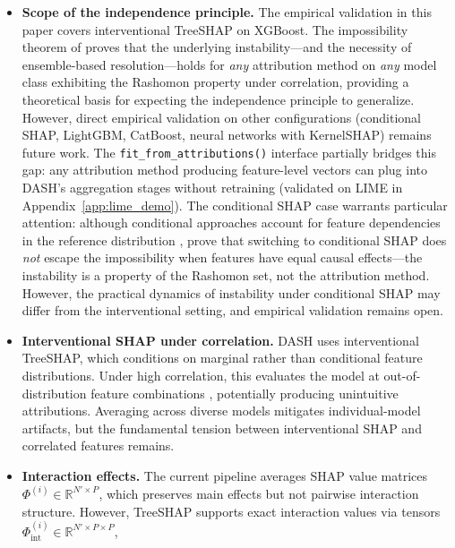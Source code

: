 \documentclass[10pt]{article}
\newcommand{\dash}{\textsc{DASH}}
\begin{document}
\begin{itemize}
  \item \textbf{Scope of the independence principle.} The empirical
    validation in this paper covers interventional TreeSHAP on XGBoost.
    The impossibility theorem of
    \citet{caraker2026impossibility} proves that the underlying
    instability---and the necessity of ensemble-based resolution---holds
    for \emph{any} attribution method on \emph{any} model class
    exhibiting the Rashomon property under correlation, providing a
    theoretical basis for expecting the independence principle to
    generalize.  However, direct empirical validation on other
    configurations (conditional SHAP, LightGBM, CatBoost, neural
    networks with KernelSHAP) remains future work.  The
    \texttt{fit\_from\_attributions()} interface partially bridges this
    gap: any attribution method producing feature-level vectors can
    plug into \dash{}'s aggregation stages without retraining
    (validated on LIME in Appendix~\ref{app:lime_demo}).
    The conditional SHAP case warrants particular attention: although
    conditional approaches account for feature dependencies in the
    reference distribution \citep{aas2021explaining},
    \citet{caraker2026impossibility} prove that switching to
    conditional SHAP does \emph{not} escape the impossibility when
    features have equal causal effects---the instability is a property of
    the Rashomon set, not the attribution method.  However, the
    practical dynamics of instability under conditional SHAP may differ
    from the interventional setting, and empirical validation remains
    open.
  \item \textbf{Interventional SHAP under correlation.} DASH uses
    interventional TreeSHAP, which conditions on marginal rather than
    conditional feature distributions. Under high correlation, this
    evaluates the model at out-of-distribution feature combinations
    \citep{janzing2020feature, aas2021explaining}, potentially
    producing unintuitive attributions. Averaging across diverse models
    mitigates individual-model artifacts, but the fundamental tension
    between interventional SHAP and correlated features remains.
  \item \textbf{Interaction effects.} The current pipeline averages SHAP
    value matrices $\Phi^{(i)} \in \mathbb{R}^{N' \times P}$, which
    preserves main effects but not pairwise interaction structure.
    However, TreeSHAP supports exact interaction values via tensors
    $\Phi_{\text{int}}^{(i)} \in \mathbb{R}^{N' \times P \times P}$,

\end{itemize}
\end{document}
